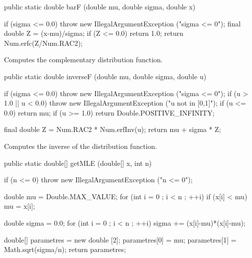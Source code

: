 \begin{htmlonly}
\end{htmlonly}
\begin{code}

   public static double barF (double mu, double sigma, double x)\begin{hide} {
      if (sigma <= 0.0)
         throw new IllegalArgumentException ("sigma <= 0");
      final double Z = (x-mu)/sigma;
      if (Z <= 0.0) return 1.0;
      return Num.erfc(Z/Num.RAC2);
   }\end{hide}
\end{code}
\begin{tabb}  Computes the complementary distribution function.
\end{tabb}
\begin{htmlonly}
\end{htmlonly}
\begin{code}

   public static double inverseF (double mu, double sigma, double u)\begin{hide} {
      if (sigma <= 0.0)
         throw new IllegalArgumentException ("sigma <= 0");
      if (u > 1.0 || u < 0.0)
         throw new IllegalArgumentException ("u not in [0,1]");
      if (u <= 0.0) return mu;
      if (u >= 1.0)
         return Double.POSITIVE_INFINITY;

      final double Z = Num.RAC2 * Num.erfInv(u);
      return mu + sigma * Z;
   }\end{hide}
\end{code}
\begin{tabb}  Computes the inverse of the distribution function.
\end{tabb}
\begin{htmlonly}
\end{htmlonly}
\begin{code}

   public static double[] getMLE (double[] x, int n)\begin{hide} {
      if (n <= 0)
         throw new IllegalArgumentException ("n <= 0");

      double mu = Double.MAX_VALUE;
      for (int i = 0 ; i < n ; ++i)
         if (x[i] < mu)
            mu = x[i];

      double sigma = 0.0;
      for (int i = 0 ; i < n ; ++i)
         sigma += (x[i]-mu)*(x[i]-mu);

      double[] parametres = new double [2];
      parametres[0] = mu;
      parametres[1] = Math.sqrt(sigma/n);
      return parametres;
   }\end{hide}
\end{code}
